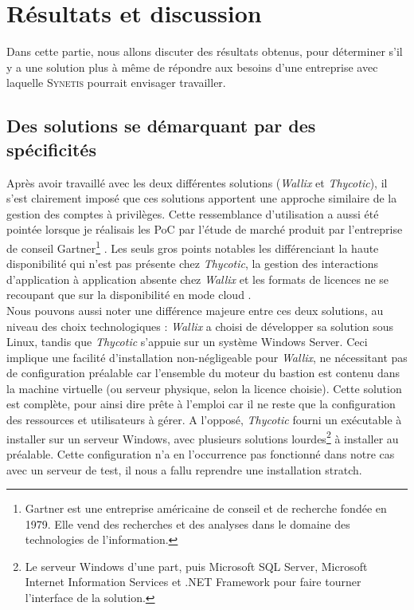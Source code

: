 \section{Résultats et discussion}
\label{sec:resultats}

Dans cette partie, nous allons discuter des résultats obtenus, pour déterminer s'il y a une solution plus à même de répondre aux besoins d'une entreprise avec laquelle \textsc{Synetis} pourrait envisager travailler.

\subsection{Des solutions se démarquant par des spécificités}
\label{subsec:soltaille}

Après avoir travaillé avec les deux différentes solutions (\emph{Wallix} et \emph{Thycotic}), il s'est clairement imposé que ces solutions apportent une approche similaire de la gestion des comptes à privilèges. Cette ressemblance d'utilisation a aussi été pointée lorsque je réalisais les PoC par l'étude de marché produit par l'entreprise de conseil Gartner\footnote{Gartner est une entreprise américaine de conseil et de recherche fondée en 1979. Elle vend des recherches et des analyses dans le domaine des technologies de l'information.} \cite{gar}. Les seuls gros points notables les différenciant la haute disponibilité qui n'est pas présente chez \emph{Thycotic}, la gestion des interactions d'application à application absente chez \emph{Wallix} et les formats de licences ne se recoupant que sur la disponibilité en mode \og cloud \fg{}.\\
Nous pouvons aussi noter une différence majeure entre ces deux solutions, au niveau des choix technologiques : \emph{Wallix} a choisi de développer sa solution sous Linux, tandis que \emph{Thycotic} s'appuie sur un système Windows Server. Ceci implique une facilité d'installation non-négligeable pour \emph{Wallix}, ne nécessitant pas de configuration préalable car l'ensemble du moteur du bastion est contenu dans la machine virtuelle (ou serveur physique, selon la licence choisie). Cette solution est complète, pour ainsi dire \og prête à l'emploi \fg{} car il ne reste que la configuration des ressources et utilisateurs à gérer. A l'opposé, \emph{Thycotic} fourni un exécutable à installer sur un serveur Windows, avec plusieurs solutions lourdes\footnote{Le serveur Windows d'une part, puis Microsoft SQL Server, Microsoft Internet Information Services et .NET Framework pour faire tourner l'interface de la solution.} à installer au préalable. Cette configuration n'a en l'occurrence pas fonctionné dans notre cas avec un serveur de test, il nous a fallu reprendre une installation \gls{stratch}.\\
